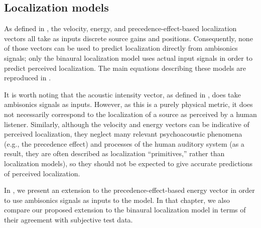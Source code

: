 \subsection{Localization models}
As defined in , the velocity, energy, and precedence-effect-based localization vectors all take as inputs discrete source gains and positions.
Consequently, none of those vectors can be used to predict localization directly from ambisonics signals; only the binaural localization model uses actual input signals in order to predict perceived localization.
The main equations describing these models are reproduced in .



It is worth noting that the acoustic intensity vector, as defined in , does take ambisonics signals as inputs.
However, as this is a purely physical metric, it does not necessarily correspond to the localization of a source as perceived by a human listener.
Similarly, although the velocity and energy vectors can be indicative of perceived localization, they neglect many relevant psychoacoustic phenomena (e.g., the precedence effect) and processes of the human auditory system (as a result, they are often described as localization ``primitives,'' rather than localization models), so they should not be expected to give accurate predictions of perceived localization.

In , we present an extension to the precedence-effect-based energy vector in order to use ambisonics signals as inputs to the model.
In that chapter, we also compare our proposed extension to the binaural localization model in terms of their agreement with subjective test data.